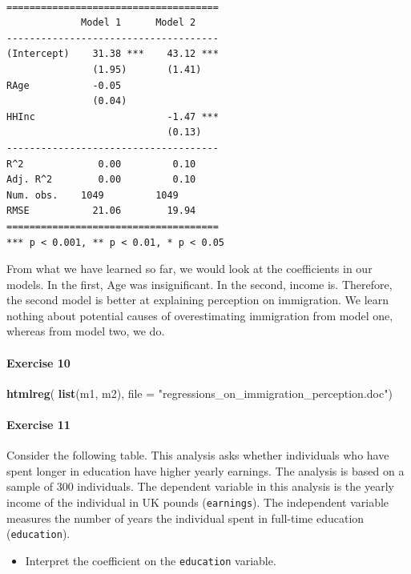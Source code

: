 \documentclass[]{article}
\newenvironment{Shaded}{\begin{snugshade}}{\end{snugshade}}
\newcommand{\KeywordTok}[1]{\textcolor[rgb]{0.13,0.29,0.53}{\textbf{#1}}}
\newcommand{\DataTypeTok}[1]{\textcolor[rgb]{0.13,0.29,0.53}{#1}}
\newcommand{\StringTok}[1]{\textcolor[rgb]{0.31,0.60,0.02}{#1}}
\newcommand{\NormalTok}[1]{#1}
\providecommand{\tightlist}{%
  \setlength{\itemsep}{0pt}\setlength{\parskip}{0pt}}
\let\oldparagraph\paragraph
\renewcommand{\paragraph}[1]{\oldparagraph{#1}\mbox{}}
\theoremstyle{definition}
\theoremstyle{definition}
\theoremstyle{definition}
\theoremstyle{remark}
\begin{document}
\begin{verbatim}

=====================================
             Model 1      Model 2    
-------------------------------------
(Intercept)    31.38 ***    43.12 ***
               (1.95)       (1.41)   
RAge           -0.05                 
               (0.04)                
HHInc                       -1.47 ***
                            (0.13)   
-------------------------------------
R^2             0.00         0.10    
Adj. R^2        0.00         0.10    
Num. obs.    1049         1049       
RMSE           21.06        19.94    
=====================================
*** p < 0.001, ** p < 0.01, * p < 0.05
\end{verbatim}

From what we have learned so far, we would look at the coefficients in
our models. In the first, Age was insignificant. In the second, income
is. Therefore, the second model is better at explaining perception on
immigration. We learn nothing about potential causes of overestimating
immigration from model one, whereas from model two, we do.

\paragraph{Exercise 10}\label{exercise-10-4}

\begin{Shaded}
\begin{Highlighting}[]
\KeywordTok{htmlreg}\NormalTok{( }\KeywordTok{list}\NormalTok{(m1, m2), }\DataTypeTok{file =} \StringTok{"regressions_on_immigration_perception.doc"}\NormalTok{)}
\end{Highlighting}
\end{Shaded}

\paragraph{Exercise 11}\label{exercise-11-3}

Consider the following table. This analysis asks whether individuals who
have spent longer in education have higher yearly earnings. The analysis
is based on a sample of 300 individuals. The dependent variable in this
analysis is the yearly income of the individual in UK pounds
(\texttt{earnings}). The independent variable measures the number of
years the individual spent in full-time education (\texttt{education}).

\begin{itemize}
\tightlist
\item
  Interpret the coefficient on the \texttt{education} variable.
\end{itemize}
\end{document}
